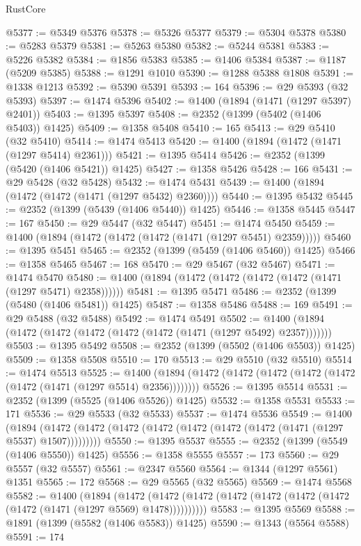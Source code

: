 \begin{lexlean}{RustCore}
\begin{coremodule}
@5377 := @5349 @5376
@5378 := @5326 @5377
@5379 := @5304 @5378
@5380 := @5283 @5379
@5381 := @5263 @5380
@5382 := @5244 @5381
@5383 := @5226 @5382
@5384 := @1856 @5383
@5385 := @1406 @5384
@5387 := @1187 (@5209 @5385)
@5388 := @1291 @1010
@5390 := @1288 @5388 @1808
@5391 := @1338 @1213
@5392 := @5390 @5391
@5393 := 164
@5396 := @29 @5393 (@32 @5393)
@5397 := @1474 @5396
@5402 := @1400 (@1894 (@1471 (@1297 @5397) @2401))
@5403 := @1395 @5397
@5408 := @2352 (@1399 (@5402 (@1406 @5403)) @1425)
@5409 := @1358 @5408
@5410 := 165
@5413 := @29 @5410 (@32 @5410)
@5414 := @1474 @5413
@5420 := @1400 (@1894 (@1472 (@1471 (@1297 @5414) @2361)))
@5421 := @1395 @5414
@5426 := @2352 (@1399 (@5420 (@1406 @5421)) @1425)
@5427 := @1358 @5426
@5428 := 166
@5431 := @29 @5428 (@32 @5428)
@5432 := @1474 @5431
@5439 := @1400 (@1894 (@1472 (@1472 (@1471 (@1297 @5432) @2360))))
@5440 := @1395 @5432
@5445 := @2352 (@1399 (@5439 (@1406 @5440)) @1425)
@5446 := @1358 @5445
@5447 := 167
@5450 := @29 @5447 (@32 @5447)
@5451 := @1474 @5450
@5459 := @1400 (@1894 (@1472 (@1472 (@1472 (@1471 (@1297 @5451) @2359)))))
@5460 := @1395 @5451
@5465 := @2352 (@1399 (@5459 (@1406 @5460)) @1425)
@5466 := @1358 @5465
@5467 := 168
@5470 := @29 @5467 (@32 @5467)
@5471 := @1474 @5470
@5480 := @1400 (@1894 (@1472 (@1472 (@1472 (@1472 (@1471 (@1297 @5471) @2358))))))
@5481 := @1395 @5471
@5486 := @2352 (@1399 (@5480 (@1406 @5481)) @1425)
@5487 := @1358 @5486
@5488 := 169
@5491 := @29 @5488 (@32 @5488)
@5492 := @1474 @5491
@5502 := @1400 (@1894 (@1472 (@1472 (@1472 (@1472 (@1472 (@1471 (@1297 @5492) @2357)))))))
@5503 := @1395 @5492
@5508 := @2352 (@1399 (@5502 (@1406 @5503)) @1425)
@5509 := @1358 @5508
@5510 := 170
@5513 := @29 @5510 (@32 @5510)
@5514 := @1474 @5513
@5525 := @1400 (@1894 (@1472 (@1472 (@1472 (@1472 (@1472 (@1472 (@1471 (@1297 @5514) @2356))))))))
@5526 := @1395 @5514
@5531 := @2352 (@1399 (@5525 (@1406 @5526)) @1425)
@5532 := @1358 @5531
@5533 := 171
@5536 := @29 @5533 (@32 @5533)
@5537 := @1474 @5536
@5549 := @1400
    (@1894 (@1472 (@1472 (@1472 (@1472 (@1472 (@1472 (@1472 (@1471 (@1297 @5537) @1507)))))))))
@5550 := @1395 @5537
@5555 := @2352 (@1399 (@5549 (@1406 @5550)) @1425)
@5556 := @1358 @5555
@5557 := 173
@5560 := @29 @5557 (@32 @5557)
@5561 := @2347 @5560
@5564 := @1344 (@1297 @5561) @1351
@5565 := 172
@5568 := @29 @5565 (@32 @5565)
@5569 := @1474 @5568
@5582 := @1400
    (@1894
      (@1472 (@1472 (@1472 (@1472 (@1472 (@1472 (@1472 (@1472 (@1471 (@1297 @5569) @1478))))))))))
@5583 := @1395 @5569
@5588 := @1891 (@1399 (@5582 (@1406 @5583)) @1425)
@5590 := @1343 (@5564 @5588)
@5591 := 174

\end{coremodule}
\end{lexlean}
